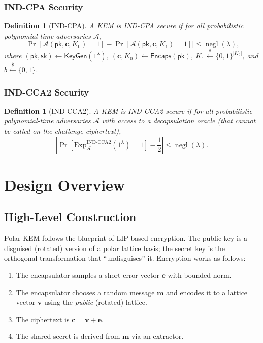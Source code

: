 \documentclass[11pt,a4paper]{article}
\newtheorem{definition}[theorem]{Definition}
\newcommand{\polarKem}{\textsf{Polar-KEM}\xspace}
\newcommand{\bit}{\{0,1\}}
\DeclareMathOperator{\negl}{negl}
\newcommand{\sample}{\xleftarrow{\$}}
\newcommand{\pk}{\mathsf{pk}}
\newcommand{\sk}{\mathsf{sk}}
\begin{document}
\subsubsection{IND-CPA Security}

\begin{definition}[IND-CPA]\label{def:indcpa}
A KEM is \emph{IND-CPA secure} if for all probabilistic polynomial-time adversaries $\mathcal{A}$,
\[
\left|\Pr\left[\mathcal{A}(\pk, \mathbf{c}, K_0) = 1\right] - \Pr\left[\mathcal{A}(\pk, \mathbf{c}, K_1) = 1\right]\right| \leq \negl(\lambda),
\]
where $(\pk, \sk) \gets \mathsf{KeyGen}(1^\lambda)$, $(\mathbf{c}, K_0) \gets \mathsf{Encaps}(\pk)$, $K_1 \sample \bit^{|K_0|}$, and $b \sample \{0, 1\}$.
\end{definition}

\subsubsection{IND-CCA2 Security}

\begin{definition}[IND-CCA2]\label{def:indcca}
A KEM is \emph{IND-CCA2 secure} if for all probabilistic polynomial-time adversaries $\mathcal{A}$ with access to a decapsulation oracle (that cannot be called on the challenge ciphertext),
\[
\left|\Pr[\text{Exp}_{\mathcal{A}}^{\text{IND-CCA2}}(1^\lambda) = 1] - \frac{1}{2}\right| \leq \negl(\lambda).
\]
\end{definition}


\section{Design Overview}\label{sec:design}

\subsection{High-Level Construction}\label{sec:high-level}

\polarKem follows the blueprint of LIP-based encryption. The public key is a disguised (rotated) version of a polar lattice basis; the secret key is the orthogonal transformation that ``undisguises'' it. Encryption works as follows:

\begin{enumerate}[leftmargin=2em]
\item The encapsulator samples a short error vector $\mathbf{e}$ with bounded norm.
\item The encapsulator chooses a random message $\mathbf{m}$ and encodes it to a lattice vector $\mathbf{v}$ using the \emph{public} (rotated) lattice.
\item The ciphertext is $\mathbf{c} = \mathbf{v} + \mathbf{e}$.
\item The shared secret is derived from $\mathbf{m}$ via an extractor.
\end{enumerate}
\end{document}
